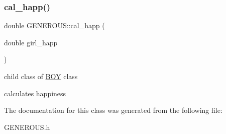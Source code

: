 \subsubsection{\texorpdfstring{cal\+\_\+happ()}{cal\_happ()}}
{\footnotesize\ttfamily double G\+E\+N\+E\+R\+O\+U\+S\+::cal\+\_\+happ (\begin{DoxyParamCaption}\item[{double}]{girl\+\_\+happ }\end{DoxyParamCaption})\hspace{0.3cm}{\ttfamily [inline]}}



child class of \hyperlink{classBOY}{B\+OY} class 

calculates happiness 

The documentation for this class was generated from the following file\+:\begin{DoxyCompactItemize}
\item 
G\+E\+N\+E\+R\+O\+U\+S.\+h\end{DoxyCompactItemize}
